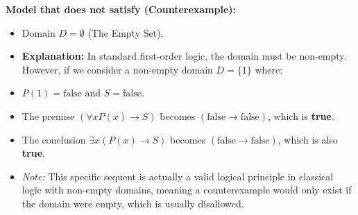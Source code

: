\documentclass{article}
\begin{document}
\textbf{Model that does not satisfy (Counterexample):}
\begin{itemize}
    \item Domain $D = \emptyset$ (The Empty Set).
    \item \textbf{Explanation:} In standard first-order logic, the domain must be non-empty. However, if we consider a non-empty domain $D=\{1\}$ where:
    \item $P(1) = \text{false}$ and $S = \text{false}$.
    \item The premise $(\forall x P(x) \rightarrow S)$ becomes $(\text{false} \rightarrow \text{false})$, which is \textbf{true}.
    \item The conclusion $\exists x (P(x) \rightarrow S)$ becomes $(\text{false} \rightarrow \text{false})$, which is also \textbf{true}.
    \item \textit{Note:} This specific sequent is actually a valid logical principle in classical logic with non-empty domains, meaning a counterexample would only exist if the domain were empty, which is usually disallowed.
\end{itemize}
\end{document}
